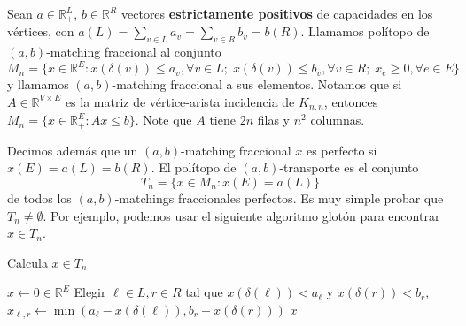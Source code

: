\documentclass{article}
\newcommand{\RR}{\mathbb R}
\theoremstyle{plain}
\theoremstyle{definition}
\theoremstyle{Azul}
\begin{document}
Sean $a\in \RR_+^L$, $b\in \RR_+^R$ vectores \textbf{estrictamente positivos} de capacidades en los vértices, con $a(L)=\sum_{v\in L}a_v=\sum_{v\in R}b_v=b(R)$. Llamamos polítopo de $(a,b)$-matching fraccional al conjunto
$$M_n=\{x\in \RR^E\colon x(\delta(v))\leq a_v, \forall v\in L;\; x(\delta(v))\leq b_v, \forall v\in R;\; x_e\geq 0, \forall e\in E\}$$
y llamamos $(a,b)$-matching fraccional a sus elementos.
Notamos que si $A\in \RR^{V\times E}$ es la matriz de vértice-arista incidencia de $K_{n,n}$, entonces $M_n=\{x\in \RR^E_+\colon Ax\leq b\}$. Note que $A$ tiene $2n$ filas y $n^2$ columnas.

Decimos además que un $(a,b)$-matching fraccional $x$ es perfecto si $x(E)=a(L)=b(R)$. El polítopo de $(a,b)$-transporte es el conjunto $$T_n=\{x\in M_n\colon x(E)=a(L)\}$$ de todos los $(a,b)$-matchings fraccionales perfectos. Es muy simple probar que $T_n\neq \emptyset$. Por ejemplo, podemos usar el siguiente algoritmo glotón para encontrar $x\in T_n$.
\newpage
\begin{algorithm} %
\caption{Calcula $x\in T_n$} %
\begin{algorithmic} %
    \STATE $x\gets 0\in \RR^E$
        \STATE Elegir $\ell \in L, r\in R$ tal que $x(\delta(\ell))<a_{\ell}$ y $x(\delta(r))<b_{r}$,\\
        \STATE $x_{\ell, r}\gets \min(a_{\ell}-x(\delta(\ell)), b_{r}-x(\delta(r)))$
    \ENDWHILE   
    \RETURN $x$
    \end{algorithmic}
\end{algorithm}
\end{document}
